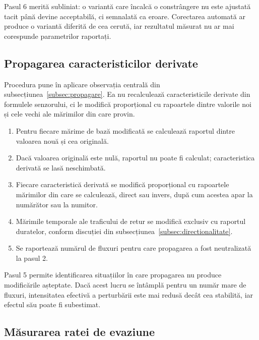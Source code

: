 Pasul 6 merită subliniat: o variantă care încalcă o constrângere nu este ajustată tacit până devine acceptabilă, ci semnalată ca eroare. Corectarea automată ar produce o variantă diferită de cea cerută, iar rezultatul măsurat nu ar mai corespunde parametrilor raportați.

\subsection{Propagarea caracteristicilor derivate}\label{subsec:alg-propagare}

Procedura pune în aplicare observația centrală din subsecțiunea~\ref{subsec:propagare}. Ea nu recalculează caracteristicile derivate din formulele senzorului, ci le modifică proporțional cu rapoartele dintre valorile noi și cele vechi ale mărimilor din care provin.

\begin{algorithm}[!ht]
\caption{Propagarea prin rapoarte}\label{alg:propagare}
\begin{enumerate}\itemsep2pt
    \item Pentru fiecare mărime de bază modificată se calculează raportul dintre valoarea nouă și cea originală.
    \item Dacă valoarea originală este nulă, raportul nu poate fi calculat; caracteristica derivată se lasă neschimbată.
    \item Fiecare caracteristică derivată se modifică proporțional cu rapoartele mărimilor din care se calculează, direct sau invers, după cum acestea apar la numărător sau la numitor.
    \item Mărimile temporale ale traficului de retur se modifică exclusiv cu raportul duratelor, conform discuției din subsecțiunea~\ref{subsec:directionalitate}.
    \item Se raportează numărul de fluxuri pentru care propagarea a fost neutralizată la pasul 2.
\end{enumerate}
\end{algorithm}

Pasul 5 permite identificarea situațiilor în care propagarea nu produce modificările așteptate. Dacă acest lucru se întâmplă pentru un număr mare de fluxuri, intensitatea efectivă a perturbării este mai redusă decât cea stabilită, iar efectul său poate fi subestimat.

\subsection{Măsurarea ratei de evaziune}\label{subsec:alg-masurare}

